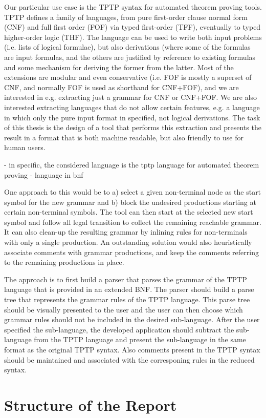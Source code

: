 Our particular use case is the TPTP syntax for automated theorem proving tools. TPTP defines a family of languages, from pure first-order clause normal form (CNF) and full first order (FOF) via typed first-order (TFF), eventually to typed higher-order logic (THF). The language can be used to write both input problems (i.e. lists of logical formulae), but also derivations (where some of the formulas are input formulas, and the others are justified by reference to existing formulas and some mechanism for deriving the former from the latter. Most of the extensions are modular and even conservative (i.e. FOF is mostly a superset of CNF, and normally FOF is used as shorthand for CNF+FOF), and we are interested in e.g. extracting just a grammar for CNF or CNF+FOF. We are also interested extracting languages that do not allow certain features, e.g. a language in which only the pure input format in specified, not logical derivations. The task of this thesis is the design of a tool that performs this extraction and presents the result in a format that is both machine readable, but also friendly to use for human users.

- in specific, the considered language is the tptp language for automated theorem proving
- language in bnf

One approach to this would be to a) select a given non-terminal node as the start symbol for the new grammar and b) block the undesired productions starting at certain non-terminal symbols. The tool can then start at the selected new start symbol and follow all legal transition to collect the remaining reachable grammar. It can also clean-up the resulting grammar by inlining rules for non-terminals with only a single production. An outstanding solution would also heuristically associate comments with grammar productions, and keep the comments referring to the remaining productions in place.


The approach is to first build a parser that parses the grammar of the \ac{TPTP} language that is provided in an extended \ac{BNF}.
The parser should build a parse tree that represents the grammar rules of the \ac{TPTP} language.
This parse tree should be visually presented to the user and the user can then choose which grammar rules should not be included in the desired sub-language.
After the user specified the sub-language, the developed application should subtract the sub-language from the \ac{TPTP} language and present the sub-language in the same format as the original \ac{TPTP} syntax.
Also comments present in the  \ac{TPTP} syntax should be maintained and associated with the corresponing rules in the reduced syntax.

\section{Structure of the Report}\label{sec:Structure}
